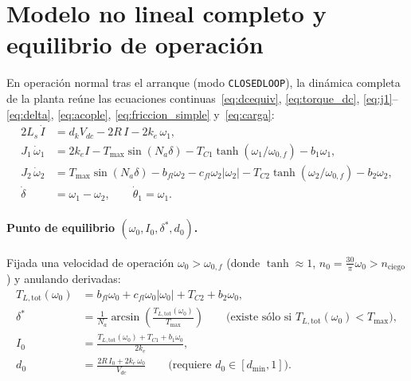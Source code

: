 \documentclass[11pt,a4paper,oneside]{report}
\theoremstyle{definition}
\theoremstyle{remark}
\begin{document}
\section{Modelo no lineal completo y equilibrio de operación}
En operación normal tras el arranque (modo \texttt{CLOSEDLOOP}), la dinámica
completa de la planta reúne las ecuaciones continuas~\eqref{eq:dcequiv},
\eqref{eq:torque_dc}, \eqref{eq:j1}--\eqref{eq:delta}, \eqref{eq:acople},
\eqref{eq:friccion_simple} y~\eqref{eq:carga}:
\begin{align}
  2L_s\,\dot I &= d_k V_{dc} - 2R\,I - 2k_e\,\omega_1, \\
  J_1\,\dot\omega_1 &= 2k_e I - T_{\max}\sin(N_a\delta) - T_{C1}\tanh(\omega_1/\omega_{0,f}) - b_1\omega_1, \\
  J_2\,\dot\omega_2 &= T_{\max}\sin(N_a\delta) - b_{fl}\omega_2 - c_{fl}\omega_2|\omega_2| - T_{C2}\tanh(\omega_2/\omega_{0,f}) - b_2\omega_2, \\
  \dot\delta &= \omega_1 - \omega_2, \qquad \dot\theta_1 = \omega_1 .
\end{align}

\paragraph{Punto de equilibrio $(\omega_0, I_0, \delta^\ast, d_0)$.} Fijada una
velocidad de operación $\omega_0 > \omega_{0,f}$ (donde $\tanh\approx 1$,
$n_0 = \frac{30}{\pi}\omega_0 > n_{\text{ciego}}$) y anulando derivadas:
\begin{align}
  T_{L,\text{tot}}(\omega_0) &= b_{fl}\omega_0 + c_{fl}\omega_0|\omega_0| + T_{C2} + b_2\omega_0, \\
  \delta^\ast &= \frac{1}{N_a}\arcsin\!\left(\frac{T_{L,\text{tot}}(\omega_0)}{T_{\max}}\right)
  \qquad\big(\text{existe sólo si } T_{L,\text{tot}}(\omega_0) < T_{\max}\big), \\
  I_0 &= \frac{T_{L,\text{tot}}(\omega_0) + T_{C1} + b_1\omega_0}{2k_e}, \\
  d_0 &= \frac{2R\,I_0 + 2k_e\,\omega_0}{V_{dc}}
  \qquad\big(\text{requiere } d_0 \in [d_{\min}, 1]\big).
\end{align}
\end{document}

